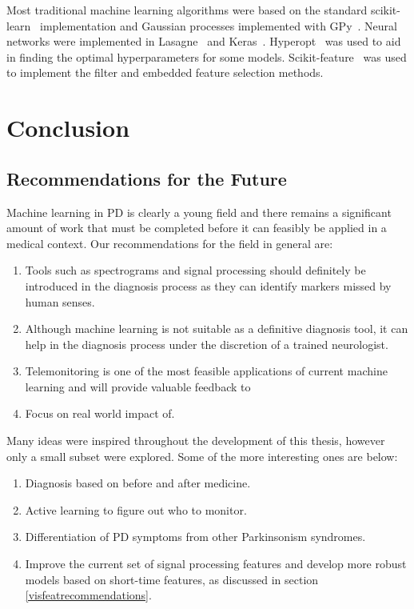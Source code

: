 \documentclass[12pt, twoside]{book}
\begin{document}
Most traditional machine learning algorithms were based on the standard scikit-learn~\cite{scikitlearn} implementation and Gaussian processes implemented with GPy~\cite{gpy2014}. Neural networks were implemented in Lasagne~\cite{lasagne} and Keras~\cite{keras}. Hyperopt~\cite{hyperopt} was used to aid in finding the optimal hyperparameters for some models. Scikit-feature~\cite{skfeature} was used to implement the filter and embedded feature selection methods. 



\chapter{Conclusion}



\section{Recommendations for the Future}
Machine learning in PD is clearly a young field and there remains a significant amount of work that must be completed before it can feasibly be applied in a medical context. Our recommendations for the field in general are:

\begin{enumerate}[noitemsep, topsep=-10pt]
	\item Tools such as spectrograms and signal processing should definitely be introduced in the diagnosis process as they can identify markers missed by human senses.
	\item Although machine learning is not suitable as a definitive diagnosis tool, it can help in the diagnosis process under the discretion of a trained neurologist.
	\item Telemonitoring is one of the most feasible applications of current machine learning and will provide valuable feedback to 
	\item Focus on real world impact of.
\end{enumerate}


Many ideas were inspired throughout the development of this thesis, however only a small subset were explored. Some of the more interesting ones are below:


\begin{enumerate}[noitemsep, topsep=-10pt]
	\item Diagnosis based on before and after medicine.
	\item Active learning to figure out who to monitor.
	\item Differentiation of PD symptoms from other Parkinsonism syndromes.
	\item Improve the current set of signal processing features and develop more robust models based on short-time features, as discussed in section \ref{visfeatrecommendations}.
\end{enumerate}


\backmatter


\end{document}
